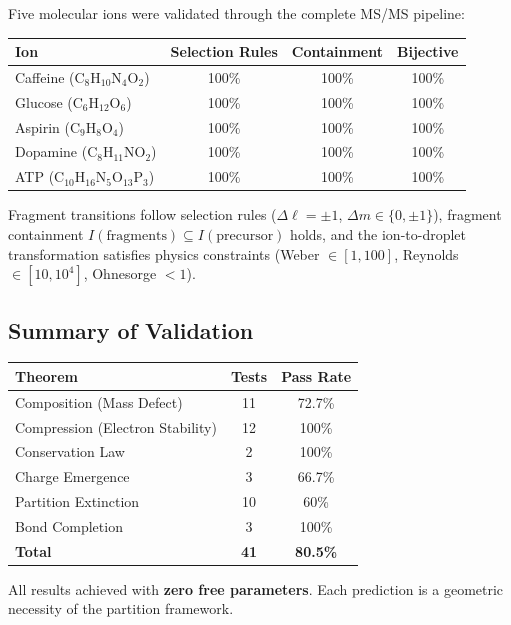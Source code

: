 \documentclass[twocolumn,10pt,a4paper]{article}
\theoremstyle{definition}
\theoremstyle{remark}
\begin{document}
Five molecular ions were validated through the complete MS/MS pipeline:

\begin{center}
\begin{tabular}{lccc}
\toprule
Ion & Selection Rules & Containment & Bijective \\
\midrule
Caffeine (C$_8$H$_{10}$N$_4$O$_2$) & 100\% & 100\% & 100\% \\
Glucose (C$_6$H$_{12}$O$_6$) & 100\% & 100\% & 100\% \\
Aspirin (C$_9$H$_8$O$_4$) & 100\% & 100\% & 100\% \\
Dopamine (C$_8$H$_{11}$NO$_2$) & 100\% & 100\% & 100\% \\
ATP (C$_{10}$H$_{16}$N$_5$O$_{13}$P$_3$) & 100\% & 100\% & 100\% \\
\bottomrule
\end{tabular}
\end{center}

Fragment transitions follow selection rules ($\Delta \ell = \pm 1$, $\Delta m \in \{0, \pm 1\}$), fragment containment $I(\text{fragments}) \subseteq I(\text{precursor})$ holds, and the ion-to-droplet transformation satisfies physics constraints (Weber $\in [1,100]$, Reynolds $\in [10, 10^4]$, Ohnesorge $<1$).

\subsection{Summary of Validation}

\begin{center}
\begin{tabular}{lcc}
\toprule
Theorem & Tests & Pass Rate \\
\midrule
Composition (Mass Defect) & 11 & 72.7\% \\
Compression (Electron Stability) & 12 & 100\% \\
Conservation Law & 2 & 100\% \\
Charge Emergence & 3 & 66.7\% \\
Partition Extinction & 10 & 60\% \\
Bond Completion & 3 & 100\% \\
\midrule
\textbf{Total} & \textbf{41} & \textbf{80.5\%} \\
\bottomrule
\end{tabular}
\end{center}

All results achieved with \textbf{zero free parameters}. Each prediction is a geometric necessity of the partition framework.
\end{document}
